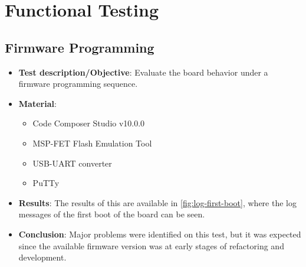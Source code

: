 \section{Functional Testing}

\subsection{Firmware Programming}

\begin{itemize}
    \item \textbf{Test description/Objective}: Evaluate the board behavior under a firmware programming sequence.
    \item \textbf{Material}:
        \begin{itemize}
            \item Code Composer Studio v10.0.0
            \item MSP-FET Flash Emulation Tool
            \item USB-UART converter
            \item PuTTy
        \end{itemize}
    \item \textbf{Results}: The results of this are available in \autoref{fig:log-first-boot}, where the log messages of the first boot of the board can be seen.
    \item \textbf{Conclusion}: Major problems were identified on this test, but it was expected since the available firmware version was at early stages of refactoring and development.
\end{itemize}

